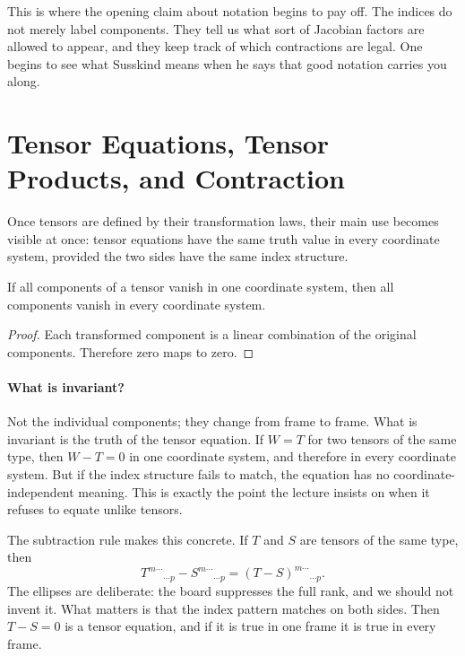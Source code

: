 This is where the opening claim about notation begins to pay off. The indices do not merely label components. They tell us what sort of Jacobian factors are allowed to appear, and they keep track of which contractions are legal. One begins to see what Susskind means when he says that good notation carries you along.

\section{Tensor Equations, Tensor Products, and Contraction}

Once tensors are defined by their transformation laws, their main use becomes visible at once: tensor equations have the same truth value in every coordinate system, provided the two sides have the same index structure.

\begin{proposition}
If all components of a tensor vanish in one coordinate system, then all components vanish in every coordinate system.
\end{proposition}

\begin{proof}
Each transformed component is a linear combination of the original components. Therefore zero maps to zero.
\end{proof}

\paragraph{What is invariant?}
Not the individual components; they change from frame to frame. What is invariant is the truth of the tensor equation. If \(W=T\) for two tensors of the same type, then \(W-T=0\) in one coordinate system, and therefore in every coordinate system. But if the index structure fails to match, the equation has no coordinate-independent meaning. This is exactly the point the lecture insists on when it refuses to equate unlike tensors.

The subtraction rule makes this concrete. If \(T\) and \(S\) are tensors of the same type, then
\begin{equation}
T^{m\cdots}{}_{\cdots p}-S^{m\cdots}{}_{\cdots p}
=
(T-S)^{m\cdots}{}_{\cdots p}.
\end{equation}
The ellipses are deliberate: the board suppresses the full rank, and we should not invent it. What matters is that the index pattern matches on both sides. Then \(T-S=0\) is a tensor equation, and if it is true in one frame it is true in every frame.

